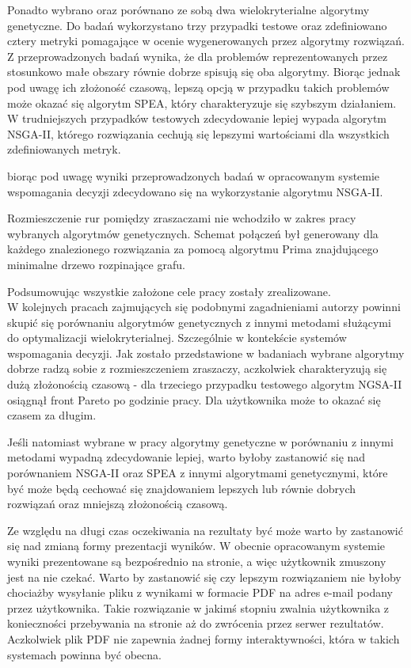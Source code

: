 \documentclass[twoside]{iisthesis}
\begin{document}
Ponadto wybrano oraz porównano ze sobą dwa wielokryterialne algorytmy genetyczne. Do badań wykorzystano trzy przypadki testowe oraz zdefiniowano cztery metryki pomagające w ocenie wygenerowanych przez algorytmy rozwiązań. Z przeprowadzonych badań wynika, że dla problemów reprezentowanych przez stosunkowo małe obszary równie dobrze spisują się oba algorytmy. Biorąc jednak pod uwagę ich złożoność czasową, lepszą opcją w przypadku takich problemów może okazać się algorytm SPEA, który charakteryzuje się szybszym działaniem. W trudniejszych przypadków testowych zdecydowanie lepiej wypada algorytm NSGA-II, którego rozwiązania cechują się lepszymi wartościami dla wszystkich zdefiniowanych metryk.

biorąc pod uwagę wyniki przeprowadzonych badań w opracowanym systemie wspomagania decyzji zdecydowano się na wykorzystanie algorytmu NSGA-II.

Rozmieszczenie rur pomiędzy zraszaczami nie wchodziło w zakres pracy wybranych algorytmów genetycznych. Schemat połączeń był generowany dla każdego znalezionego rozwiązania za pomocą algorytmu Prima znajdującego minimalne drzewo rozpinające grafu.

Podsumowując wszystkie założone cele pracy zostały zrealizowane.\\

W kolejnych pracach zajmujących się podobnymi zagadnieniami autorzy powinni skupić się porównaniu algorytmów genetycznych z innymi metodami służącymi do optymalizacji wielokryterialnej. Szczególnie w kontekście systemów wspomagania decyzji. Jak zostało przedstawione w badaniach wybrane algorytmy dobrze radzą sobie z rozmieszczeniem zraszaczy, aczkolwiek charakteryzują się dużą złożonością czasową - dla trzeciego przypadku testowego algorytm NGSA-II osiągnął front Pareto po godzinie pracy. Dla użytkownika może to okazać się czasem za długim. 

Jeśli natomiast wybrane w pracy algorytmy genetyczne w porównaniu z innymi metodami wypadną zdecydowanie lepiej, warto byłoby zastanowić się nad porównaniem NSGA-II oraz SPEA z innymi algorytmami genetycznymi, które być może będą cechować się znajdowaniem lepszych lub równie dobrych rozwiązań oraz mniejszą złożonością czasową.

Ze względu na długi czas oczekiwania na rezultaty być może warto by zastanowić się nad zmianą formy prezentacji wyników. W obecnie opracowanym systemie wyniki prezentowane są bezpośrednio na stronie, a więc użytkownik zmuszony jest na nie czekać. Warto by zastanowić się czy lepszym rozwiązaniem nie byłoby chociażby wysyłanie pliku z wynikami w formacie PDF na adres e-mail podany przez użytkownika. Takie rozwiązanie w jakimś stopniu zwalnia użytkownika z konieczności przebywania na stronie aż do zwrócenia przez serwer rezultatów. Aczkolwiek plik PDF nie zapewnia żadnej formy interaktywności, która w takich systemach powinna być obecna.
\end{document}
